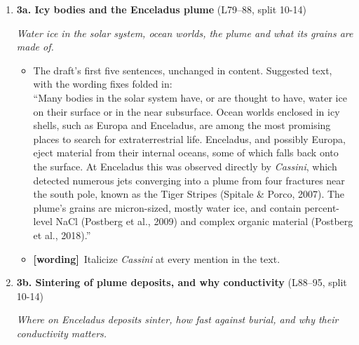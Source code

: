 \documentclass[11pt]{article}
\newcommand{\Pg}[3]{\item \textbf{#1} {\small(#2)}\par\textit{#3}}
\newcommand{\tC}{\textcolor{miss}{\textbf{[correct]}}\ }
\newcommand{\tG}{\textcolor{stale}{\textbf{[wording]}}\ }
\newcommand{\tA}{\textcolor{have}{\textbf{[add]}}\ }
\newcommand{\add}[1]{\textcolor{revX}{#1}}
\providecommand{\citep}[1]{(\texttt{\detokenize{#1}})}
\providecommand{\citet}[1]{\texttt{\detokenize{#1}}}
\begin{document}
\begin{enumerate}
\Pg{3a. Icy bodies and the Enceladus plume}{L79--88, split 10-14}{Water ice in the solar system, ocean worlds, the plume and what its grains are made of.}
  \begin{itemize}
  \item The draft's first five sentences, unchanged in content. Suggested
    text, with the wording fixes folded in:\\
    ``Many bodies in the solar system have, or are thought to have, water
    ice on their surface or in the near subsurface. Ocean worlds enclosed in
    icy shells, such as Europa and Enceladus, are among the most promising
    places to search for extraterrestrial life. Enceladus, and possibly
    Europa, eject material from their internal oceans, some of which falls
    back onto the surface. At Enceladus this was observed directly by
    \textit{Cassini}, which detected numerous jets converging into a plume
    from four fractures near the south pole, known as the Tiger Stripes
    (Spitale \& Porco, 2007). The plume's grains are micron-sized, mostly
    water ice, and contain percent-level NaCl (Postberg et al., 2009) and
    complex organic material (Postberg et al., 2018).''
  \item \tG Italicize \textit{Cassini} at every mention in the text.
  \end{itemize}
\Pg{3b. Sintering of plume deposits, and why conductivity}{L88--95, split 10-14}{Where on Enceladus deposits sinter, how fast against burial, and why their conductivity matters.}

\end{enumerate}
\end{document}

